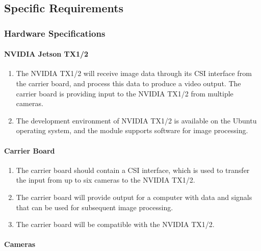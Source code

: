 \subsection{Specific Requirements}

\subsubsection{Hardware Specifications}

\paragraph{NVIDIA Jetson TX1/2}

\begin{enumerate}[label=\alph*]
	\item The NVIDIA TX1/2 will receive image data through its CSI interface from
	the carrier board, and process this data to produce a video output. The carrier
	board is providing input to the NVIDIA TX1/2 from multiple cameras. \\
	\item The development environment of NVIDIA TX1/2 is available on the Ubuntu 
	operating system, and the module supports software for image processing.\\ 
	\end{enumerate}

\paragraph{Carrier Board}

\begin{enumerate}[label=\alph*]
	\item The carrier board should contain a CSI interface, which is used to transfer the
	input from up to six cameras to the NVIDIA TX1/2. \\
	\item The carrier board will provide output for a computer with data and signals that 
	can be used for subsequent image processing.\\
	\item The carrier board will be compatible with the NVIDIA TX1/2.\\
\end{enumerate}

\paragraph{Cameras}

